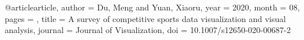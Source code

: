 @article{article,
author = {Du, Meng and Yuan, Xiaoru},
year = {2020},
month = {08},
pages = {},
title = {A survey of competitive sports data visualization and visual analysis},
journal = {Journal of Visualization},
doi = {10.1007/s12650-020-00687-2}
}